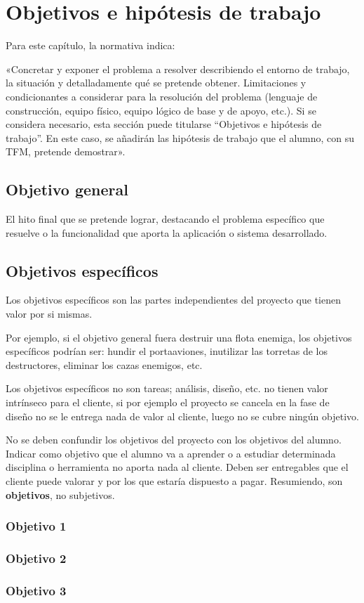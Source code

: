 \chapter{Objetivos e hipótesis de trabajo}
\label{chap:objetivos}

\noindent
Para este capítulo, la normativa indica:

«Concretar y exponer el problema a resolver describiendo el entorno de trabajo,
la situación y detalladamente qué se pretende obtener. Limitaciones y
condicionantes a considerar para la resolución del problema (lenguaje de
construcción, equipo físico, equipo lógico de base y de apoyo, etc.). Si se
considera necesario, esta sección puede titularse ``Objetivos e hipótesis de
trabajo''. En este caso, se añadirán las hipótesis de trabajo que el alumno, con
su TFM, pretende demostrar».

\section{Objetivo general}

El hito final que se pretende lograr, destacando el problema específico que
resuelve o la funcionalidad que aporta la aplicación o sistema desarrollado.


\section{Objetivos específicos}

Los objetivos específicos son las partes independientes del proyecto que tienen
valor por si mismas.

Por ejemplo, si el objetivo general fuera destruir una flota enemiga, los
objetivos específicos podrían ser: hundir el portaaviones, inutilizar las
torretas de los destructores, eliminar los cazas enemigos, etc.

Los objetivos específicos no son tareas; análisis, diseño, etc. no tienen valor
intrínseco para el cliente, si por ejemplo el proyecto se cancela en la fase de
diseño no se le entrega nada de valor al cliente, luego no se cubre ningún
objetivo.

No se deben confundir los objetivos del proyecto con los objetivos del
alumno. Indicar como objetivo que el alumno va a aprender o a estudiar
determinada disciplina o herramienta no aporta nada al cliente. Deben ser
entregables que el cliente puede valorar y por los que estaría dispuesto
a pagar. Resumiendo, son \textbf{objetivos}, no subjetivos.

\subsection{Objetivo 1}

\subsection{Objetivo 2}

\subsection{Objetivo 3}
